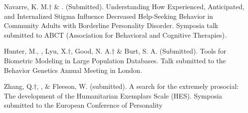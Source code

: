 \item Navarre, K. M.$\dagger$ \& \meb. (Submitted). Understanding How Experienced, Anticipated, and Internalized Stigma Influence Decreased Help-Seeking Behavior in Community Adults with Borderline Personality Disorder. Symposia talk submitted to ABCT (Association for Behavioral and Cognitive Therapies).

\item Hunter, M., \meb, Lyu, X.$\dagger$, Good, N. A.$\dagger$ \& Burt, S. A. (Submitted). Tools for Biometric Modeling in Large Population Databases. Talk submitted to the Behavior Genetics Annual Meeting in London.



\item Zhang, Q.$\dagger$, \meb, \&  Fleeson, W. (submitted). A search for the extremely prosocial: The development of the Humanitarian Exemplars Scale (HES). Symposia submitted to the European Conference of Personality %







%

%

%
